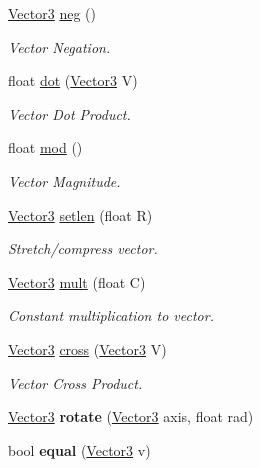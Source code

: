 \begin{DoxyCompactItemize}
\item 
\hyperlink{class_vector3}{Vector3} \hyperlink{class_vector3_aa0e0f90a643143a76c9f940e6a728e77}{neg} ()
\begin{DoxyCompactList}\small\item\em Vector Negation. \end{DoxyCompactList}\item 
float \hyperlink{class_vector3_a8b2f8af40f833c9e35796f1def43368e}{dot} (\hyperlink{class_vector3}{Vector3} V)
\begin{DoxyCompactList}\small\item\em Vector Dot Product. \end{DoxyCompactList}\item 
float \hyperlink{class_vector3_a6d61644a84639dfa0be778973cf2c27a}{mod} ()
\begin{DoxyCompactList}\small\item\em Vector Magnitude. \end{DoxyCompactList}\item 
\hyperlink{class_vector3}{Vector3} \hyperlink{class_vector3_a507df97e1279faf0264412607e4c4f98}{setlen} (float R)
\begin{DoxyCompactList}\small\item\em Stretch/compress vector. \end{DoxyCompactList}\item 
\hyperlink{class_vector3}{Vector3} \hyperlink{class_vector3_a3570b78f36a016e9d41c86ac806a41b5}{mult} (float C)
\begin{DoxyCompactList}\small\item\em Constant multiplication to vector. \end{DoxyCompactList}\item 
\hyperlink{class_vector3}{Vector3} \hyperlink{class_vector3_aab0fd1ab901380762a159b2049f110e1}{cross} (\hyperlink{class_vector3}{Vector3} V)
\begin{DoxyCompactList}\small\item\em Vector Cross Product. \end{DoxyCompactList}\item 
\hypertarget{class_vector3_adb001c5f1b92eb07a9d31799319a2a5e}{\hyperlink{class_vector3}{Vector3} {\bfseries rotate} (\hyperlink{class_vector3}{Vector3} axis, float rad)}\label{class_vector3_adb001c5f1b92eb07a9d31799319a2a5e}

\item 
\hypertarget{class_vector3_a3c6a8693c7f379350aed7b2d01073991}{bool {\bfseries equal} (\hyperlink{class_vector3}{Vector3} v)}\label{class_vector3_a3c6a8693c7f379350aed7b2d01073991}

\end{DoxyCompactItemize}
